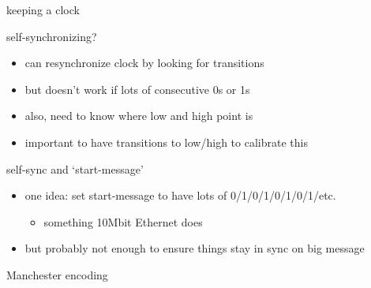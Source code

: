 \begin{frame}{keeping a clock}
\end{frame}

\begin{frame}{self-synchronizing?}
    \begin{itemize}
    \item can resynchronize clock by looking for transitions
    \item but doesn't work if lots of consecutive 0s or 1s
    \vspace{.5cm}
    \item also, need to know where low and high point is
    \item important to have transitions to low/high to calibrate this
    \end{itemize}
\end{frame}

\begin{frame}{self-sync and `start-message'}
    \begin{itemize}
    \item one idea: set start-message to have lots of 0/1/0/1/0/1/0/1/etc.
        \begin{itemize}
        \item something 10Mbit Ethernet does
        \end{itemize}
    \item but probably not enough to ensure things stay in sync on big message
    \end{itemize}
\end{frame}

\begin{frame}{Manchester encoding}
\end{frame}

